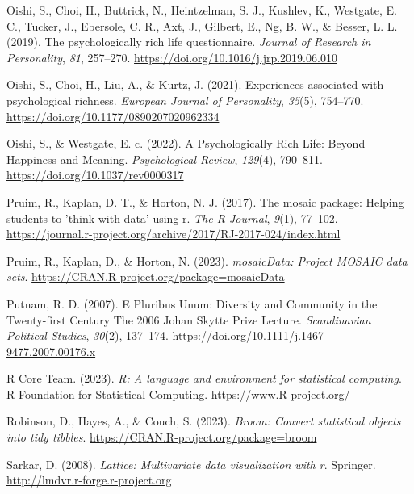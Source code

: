 \documentclass[
  man,floatsintext]{apa7}
\newlength{\cslhangindent}
\newlength{\cslentryspacingunit} %
\newenvironment{CSLReferences}[2] %
 {%
  \setlength{\parindent}{0pt}
  \ifodd #1
  \let\oldpar\par
  \def\par{\hangindent=\cslhangindent\oldpar}
  \fi
  \setlength{\parskip}{#2\cslentryspacingunit}
 }%
 {}
\begin{document}
\begin{CSLReferences}{1}{0}
\leavevmode{}%
Oishi, S., Choi, H., Buttrick, N., Heintzelman, S. J., Kushlev, K., Westgate, E. C., Tucker, J., Ebersole, C. R., Axt, J., Gilbert, E., Ng, B. W., \& Besser, L. L. (2019). The psychologically rich life questionnaire. \emph{Journal of Research in Personality}, \emph{81}, 257--270. \url{https://doi.org/10.1016/j.jrp.2019.06.010}

\leavevmode{}%
Oishi, S., Choi, H., Liu, A., \& Kurtz, J. (2021). Experiences associated with psychological richness. \emph{European Journal of Personality}, \emph{35}(5), 754--770. \url{https://doi.org/10.1177/0890207020962334}

\leavevmode{}%
Oishi, S., \& Westgate, E. c. (2022). A {Psychologically Rich Life}: {Beyond Happiness} and {Meaning}. \emph{Psychological Review}, \emph{129}(4), 790--811. \url{https://doi.org/10.1037/rev0000317}

\leavevmode{}%
Pruim, R., Kaplan, D. T., \& Horton, N. J. (2017). The mosaic package: Helping students to 'think with data' using r. \emph{The R Journal}, \emph{9}(1), 77--102. \url{https://journal.r-project.org/archive/2017/RJ-2017-024/index.html}

\leavevmode{}%
Pruim, R., Kaplan, D., \& Horton, N. (2023). \emph{mosaicData: Project MOSAIC data sets}. \url{https://CRAN.R-project.org/package=mosaicData}

\leavevmode{}%
Putnam, R. D. (2007). E {Pluribus Unum}: {Diversity} and {Community} in the {Twenty-first Century The} 2006 {Johan Skytte Prize Lecture}. \emph{Scandinavian Political Studies}, \emph{30}(2), 137--174. \url{https://doi.org/10.1111/j.1467-9477.2007.00176.x}

\leavevmode{}%
R Core Team. (2023). \emph{R: A language and environment for statistical computing}. R Foundation for Statistical Computing. \url{https://www.R-project.org/}

\leavevmode{}%
Robinson, D., Hayes, A., \& Couch, S. (2023). \emph{Broom: Convert statistical objects into tidy tibbles}. \url{https://CRAN.R-project.org/package=broom}

\leavevmode{}%
Sarkar, D. (2008). \emph{Lattice: Multivariate data visualization with r}. Springer. \url{http://lmdvr.r-forge.r-project.org}


\end{CSLReferences}
\end{document}
